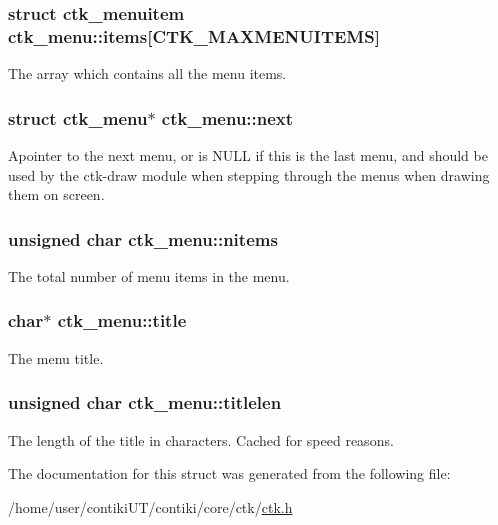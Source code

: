 \subsubsection[{items}]{\setlength{\rightskip}{0pt plus 5cm}struct {\bf ctk\+\_\+menuitem} ctk\+\_\+menu\+::items\mbox{[}C\+T\+K\+\_\+\+M\+A\+X\+M\+E\+N\+U\+I\+T\+E\+M\+S\mbox{]}}\label{structctk__menu_a5e3c53417a3e30ca1a51dfcfb0929d1f}
The array which contains all the menu items. \hypertarget{structctk__menu_a3db782ac147f877ad858f963ce3a3f31}{}
\subsubsection[{next}]{\setlength{\rightskip}{0pt plus 5cm}struct {\bf ctk\+\_\+menu}$\ast$ ctk\+\_\+menu\+::next}\label{structctk__menu_a3db782ac147f877ad858f963ce3a3f31}
Apointer to the next menu, or is N\+U\+L\+L if this is the last menu, and should be used by the ctk-\/draw module when stepping through the menus when drawing them on screen. \hypertarget{structctk__menu_a1929cc70bb8d66ead25d37828d68bfc2}{}
\subsubsection[{nitems}]{\setlength{\rightskip}{0pt plus 5cm}unsigned char ctk\+\_\+menu\+::nitems}\label{structctk__menu_a1929cc70bb8d66ead25d37828d68bfc2}
The total number of menu items in the menu. \hypertarget{structctk__menu_ad615e76a042ea15b52b7f30edc4d4c89}{}
\subsubsection[{title}]{\setlength{\rightskip}{0pt plus 5cm}char$\ast$ ctk\+\_\+menu\+::title}\label{structctk__menu_ad615e76a042ea15b52b7f30edc4d4c89}
The menu title. \hypertarget{structctk__menu_afe750b5bc481a67c6e7f684dbaa7bfd8}{}
\subsubsection[{titlelen}]{\setlength{\rightskip}{0pt plus 5cm}unsigned char ctk\+\_\+menu\+::titlelen}\label{structctk__menu_afe750b5bc481a67c6e7f684dbaa7bfd8}
The length of the title in characters. Cached for speed reasons. 

The documentation for this struct was generated from the following file\+:\begin{DoxyCompactItemize}
\item 
/home/user/contiki\+U\+T/contiki/core/ctk/\hyperlink{ctk_8h}{ctk.\+h}\end{DoxyCompactItemize}

